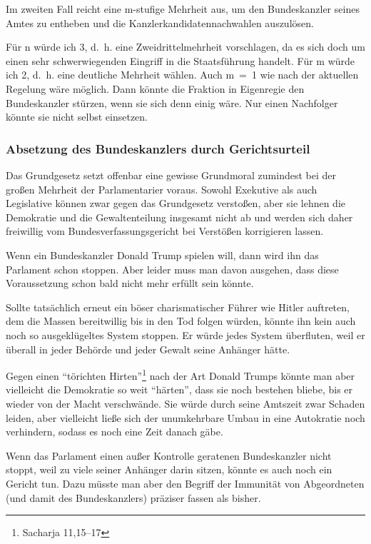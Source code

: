 Im zweiten Fall reicht eine m-stufige Mehrheit aus, um den Bundeskanzler seines Amtes zu entheben und die Kanzlerkandidatennachwahlen auszulösen.

Für n würde ich 3, d.~h. eine Zweidrittelmehrheit vorschlagen, da es sich doch um einen sehr schwerwiegenden Eingriff in die Staatsführung handelt.
Für m würde ich 2, d.~h. eine deutliche Mehrheit wählen.
Auch m~=~1 wie nach der aktuellen Regelung wäre möglich.
Dann könnte die Fraktion in Eigenregie den Bundeskanzler stürzen, wenn sie sich denn einig wäre.
Nur einen Nachfolger könnte sie nicht selbst einsetzen.

\subsubsection{Absetzung des Bundeskanzlers durch Gerichtsurteil}\label{subsubsec:absetzung_durch_gerichtsurteil}

Das Grundgesetz setzt offenbar eine gewisse Grundmoral zumindest bei der großen Mehrheit der Parlamentarier voraus.
Sowohl Exekutive als auch Legislative können zwar gegen das Grundgesetz verstoßen, aber sie lehnen die Demokratie und die Gewaltenteilung insgesamt nicht ab und werden sich daher freiwillig vom Bundesverfassungsgericht bei Verstößen korrigieren lassen.

Wenn ein Bundeskanzler Donald Trump spielen will, dann wird ihn das Parlament schon stoppen.
Aber leider muss man davon ausgehen, dass diese Voraussetzung schon bald nicht mehr erfüllt sein könnte.

Sollte tatsächlich erneut ein böser charismatischer Führer wie Hitler auftreten, dem die Massen bereitwillig bis in den Tod folgen würden, könnte ihn kein auch noch so ausgeklügeltes System stoppen.
Er würde jedes System überfluten, weil er überall in jeder Behörde und jeder Gewalt seine Anhänger hätte.

Gegen einen \enquote{törichten Hirten}\footnote{Sacharja 11,15--17} nach der Art Donald Trumps könnte man aber vielleicht die Demokratie so weit \enquote{härten}, dass sie noch bestehen bliebe, bis er wieder von der Macht verschwände.
Sie würde durch seine Amtszeit zwar Schaden leiden, aber vielleicht ließe sich der unumkehrbare Umbau in eine Autokratie noch verhindern, sodass es noch eine Zeit danach gäbe.

Wenn das Parlament einen außer Kontrolle geratenen Bundeskanzler nicht stoppt, weil zu viele seiner Anhänger darin sitzen, könnte es auch noch ein Gericht tun.
Dazu müsste man aber den Begriff der Immunität von Abgeordneten (und damit des Bundeskanzlers) präziser fassen als bisher.

